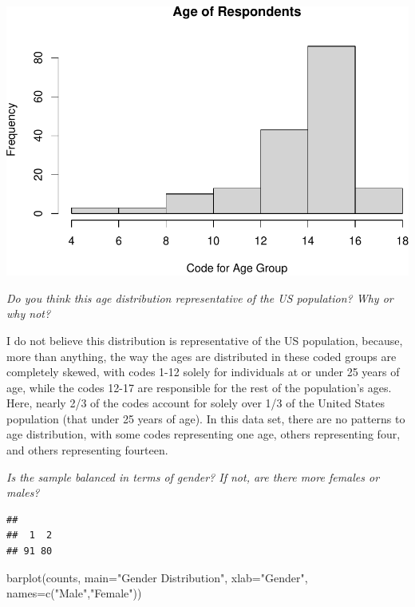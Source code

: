 \documentclass[
]{article}
\newenvironment{Shaded}{\begin{snugshade}}{\end{snugshade}}
\newcommand{\AttributeTok}[1]{\textcolor[rgb]{0.77,0.63,0.00}{#1}}
\newcommand{\FunctionTok}[1]{\textcolor[rgb]{0.00,0.00,0.00}{#1}}
\newcommand{\NormalTok}[1]{#1}
\newcommand{\OtherTok}[1]{\textcolor[rgb]{0.56,0.35,0.01}{#1}}
\newcommand{\SpecialCharTok}[1]{\textcolor[rgb]{0.00,0.00,0.00}{#1}}
\newcommand{\StringTok}[1]{\textcolor[rgb]{0.31,0.60,0.02}{#1}}
\begin{document}
\includegraphics{Journal_files/figure-latex/unnamed-chunk-13-1.pdf}

\emph{Do you think this age distribution representative of the US
population? Why or why not?}

I do not believe this distribution is representative of the US
population, because, more than anything, the way the ages are
distributed in these coded groups are completely skewed, with codes 1-12
solely for individuals at or under 25 years of age, while the codes
12-17 are responsible for the rest of the population's ages. Here,
nearly 2/3 of the codes account for solely over 1/3 of the United States
population (that under 25 years of age). In this data set, there are no
patterns to age distribution, with some codes representing one age,
others representing four, and others representing fourteen.

\emph{Is the sample balanced in terms of gender? If not, are there more
females or males?}

\begin{Shaded}
\end{Shaded}

\begin{verbatim}
## 
##  1  2 
## 91 80
\end{verbatim}

\begin{Shaded}
\begin{Highlighting}[]
\FunctionTok{barplot}\NormalTok{(counts, }\AttributeTok{main=}\StringTok{"Gender Distribution"}\NormalTok{, }\AttributeTok{xlab=}\StringTok{"Gender"}\NormalTok{, }\AttributeTok{names=}\FunctionTok{c}\NormalTok{(}\StringTok{"Male"}\NormalTok{,}\StringTok{"Female"}\NormalTok{))}
\end{Highlighting}
\end{Shaded}
\end{document}
